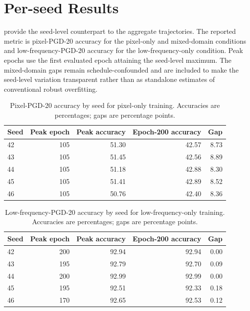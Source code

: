\documentclass{article}
\begin{document}
\appendix
\section{Per-seed Results}
\label{app:per-seed}
provide the seed-level counterpart to the aggregate trajectories. The reported
metric is pixel-PGD-20 accuracy for the pixel-only and mixed-domain conditions
and low-frequency-PGD-20 accuracy for the low-frequency-only condition. Peak
epochs use the first evaluated epoch attaining the seed-level maximum. The
mixed-domain gaps remain schedule-confounded and are included to make the
seed-level variation transparent rather than as standalone estimates of
conventional robust overfitting.

\begin{table}[t]
\centering
\caption{Pixel-PGD-20 accuracy by seed for pixel-only training.
Accuracies are percentages; gaps are percentage points.}
\label{tab:per-seed-pixel}
\begin{tabular*}{\linewidth}{@{\extracolsep{\fill}}lrrrr@{}}
\toprule
Seed & Peak epoch & Peak accuracy & Epoch-200 accuracy & Gap \\
\midrule
42 & 105 & 51.30 & 42.57 & 8.73 \\
43 & 105 & 51.45 & 42.56 & 8.89 \\
44 & 105 & 51.18 & 42.88 & 8.30 \\
45 & 105 & 51.41 & 42.89 & 8.52 \\
46 & 105 & 50.76 & 42.40 & 8.36 \\
\bottomrule
\end{tabular*}
\end{table}

\begin{table}[t]
\centering
\caption{Low-frequency-PGD-20 accuracy by seed for low-frequency-only
training. Accuracies are percentages; gaps are percentage points.}
\label{tab:per-seed-low-frequency}
\begin{tabular*}{\linewidth}{@{\extracolsep{\fill}}lrrrr@{}}
\toprule
Seed & Peak epoch & Peak accuracy & Epoch-200 accuracy & Gap \\
\midrule
42 & 200 & 92.94 & 92.94 & 0.00 \\
43 & 195 & 92.79 & 92.70 & 0.09 \\
44 & 200 & 92.99 & 92.99 & 0.00 \\
45 & 195 & 92.51 & 92.33 & 0.18 \\
46 & 170 & 92.65 & 92.53 & 0.12 \\
\bottomrule
\end{tabular*}
\end{table}
\end{document}
